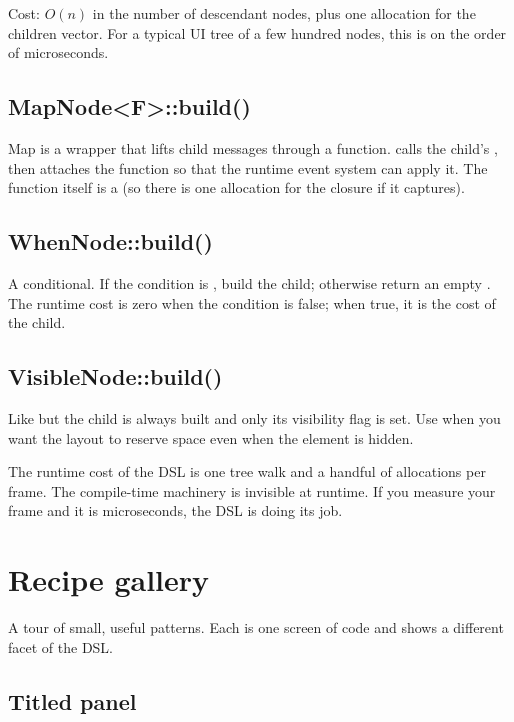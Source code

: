 Cost: $O(n)$ in the number of descendant nodes, plus one
allocation for the children vector. For a typical UI tree of a
few hundred nodes, this is on the order of microseconds.

\subsection*{MapNode<F>::build()}

Map is a wrapper that lifts child messages through a function.
 calls the child's , then attaches the
function so that the runtime event system can apply it. The
function itself is a  (so there is one
allocation for the closure if it captures).

\subsection*{WhenNode::build()}

A conditional. If the condition is , build the child;
otherwise return an empty . The runtime cost is
zero when the condition is false; when true, it is the cost of
the child.

\subsection*{VisibleNode::build()}

Like  but the child is always built and only its
visibility flag is set. Use when you want the layout to reserve
space even when the element is hidden.

\begin{recap}
The runtime cost of the DSL is one tree walk and a handful of
allocations per frame. The compile-time machinery is invisible at
runtime. If you measure your frame and it is microseconds, the
DSL is doing its job.
\end{recap}

\section{Recipe gallery}

A tour of small, useful patterns. Each is one screen of code and
shows a different facet of the DSL.

\subsection*{Titled panel}

